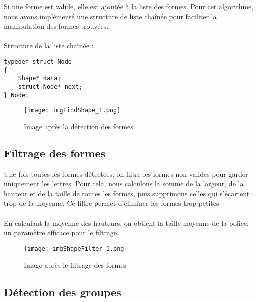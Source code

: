 \documentclass{article}
\begin{document}
Si une forme est valide, elle est ajoutée à la liste des formes. Pour cet algorithme, nous avons implémenté une structure de liste chaînée pour faciliter la manipulation des formes trouvées.
\\\\
Structure de la liste chaînée :
\begin{lstlisting}
typedef struct Node
{
    Shape* data;
    struct Node* next;
} Node;
\end{lstlisting}

\vspace{0.5cm}

\begin{figure}[H]
    \centering
    \texttt{[image: imgFindShape\_1.png]}
    \caption{Image après la détection des formes}
\end{figure}

\subsection{Filtrage des formes}

Une fois toutes les formes détectées, on filtre les formes non valides pour garder uniquement les lettres. Pour cela, nous calculons la somme de la largeur, de la hauteur et de la taille de toutes les formes, puis supprimons celles qui s'écartent trop de la moyenne. Ce filtre permet d’éliminer les formes trop petites.
\\\\
En calculant la moyenne des hauteurs, on obtient la taille moyenne de la police, un paramètre efficace pour le filtrage.

\begin{figure}[H]
    \centering
    \texttt{[image: imgShapeFilter\_1.png]}
    \caption{Image après le filtrage des formes}
\end{figure}

\subsection{Détection des groupes}
\end{document}
